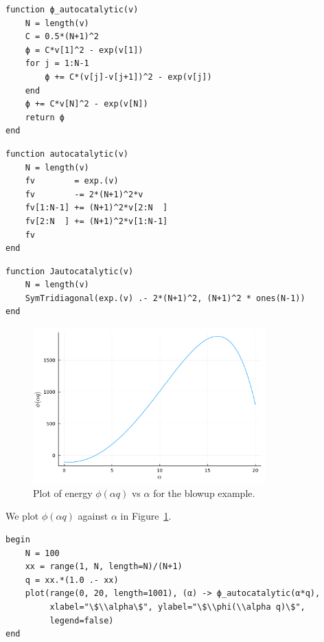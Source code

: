 \documentclass[12pt, leqno]{article} %
\begin{document}
\begin{verbatim}
function ϕ_autocatalytic(v)
    N = length(v)
    C = 0.5*(N+1)^2
    ϕ = C*v[1]^2 - exp(v[1])
    for j = 1:N-1
        ϕ += C*(v[j]-v[j+1])^2 - exp(v[j])
    end
    ϕ += C*v[N]^2 - exp(v[N])
    return ϕ
end
\end{verbatim}

\begin{verbatim}
function autocatalytic(v)
    N = length(v)
    fv        = exp.(v)
    fv        -= 2*(N+1)^2*v
    fv[1:N-1] += (N+1)^2*v[2:N  ]
    fv[2:N  ] += (N+1)^2*v[1:N-1]
    fv
end
\end{verbatim}

\begin{verbatim}
function Jautocatalytic(v)
    N = length(v)
    SymTridiagonal(exp.(v) .- 2*(N+1)^2, (N+1)^2 * ones(N-1))
end
\end{verbatim}

\begin{figure}
\begin{center}
  \includegraphics[width=0.8\textwidth]{fig/2023-04-12-phi-alpha.pdf}
\end{center}
\caption{Plot of energy $\phi(\alpha q)$ vs $\alpha$ for the blowup example.}
\label{fig:phi-alpha}
\end{figure}

We plot $\phi(\alpha q)$ against $\alpha$ in Figure~\ref{fig:phi-alpha}.

\begin{verbatim}
begin
    N = 100
    xx = range(1, N, length=N)/(N+1)
    q = xx.*(1.0 .- xx)
    plot(range(0, 20, length=1001), (α) -> ϕ_autocatalytic(α*q),
         xlabel="\$\\alpha\$", ylabel="\$\\phi(\\alpha q)\$",
         legend=false)
end
\end{verbatim}
\end{document}
